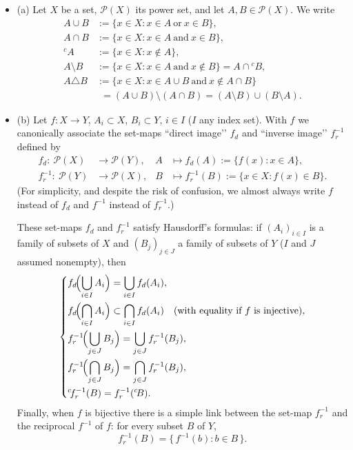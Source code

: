 \documentclass[12pt]{article}
\theoremstyle{definition}
\begin{document}
\medskip\noindent
\begin{itemize}
\item (a) Let $X$ be a set, $\mathcal P(X)$ its power set, and let $A,B\in\mathcal P(X)$. We write
\[
\begin{aligned}
A\cup B &:= \{x\in X: x\in A\ \text{or}\ x\in B\},\\
A\cap B &:= \{x\in X: x\in A\ \text{and}\ x\in B\},\\
{}^{c}\!A &:= \{x\in X: x\notin A\},\\
A\setminus B &:= \{x\in X: x\in A\ \text{and}\ x\notin B\}=A\cap{}^{c}\!B,\\
A\triangle B &:= \{x\in X: x\in A\cup B\ \text{and}\ x\notin A\cap B\}\\
&\phantom{:}= (A\cup B)\setminus(A\cap B)=(A\setminus B)\cup(B\setminus A).
\end{aligned}
\]
\medskip\noindent
\item (b) Let $f:X\to Y$, $A_i\subset X$, $B_i\subset Y$, $i\in I$ ($I$ any index set). With $f$ we canonically associate the set-maps “direct image’’ $f_d$ and “inverse image’’ $f_r^{-1}$ defined by
\[
\begin{aligned}
f_d:\ \mathcal P(X) &\longrightarrow \mathcal P(Y), & A &\longmapsto f_d(A):=\{f(x):x\in A\},\\
f_r^{-1}:\ \mathcal P(Y) &\longrightarrow \mathcal P(X), & B &\longmapsto f_r^{-1}(B):=\{x\in X: f(x)\in B\}.
\end{aligned}
\]
(For simplicity, and despite the risk of confusion, we almost always write $f$ instead of $f_d$ and $f^{-1}$ instead of $f_r^{-1}$.)

These set-maps $f_d$ and $f_r^{-1}$ satisfy Hausdorff’s formulas: if $(A_i)_{i\in I}$ is a family of subsets of $X$ and $(B_j)_{j\in J}$ a family of subsets of $Y$ ($I$ and $J$ assumed nonempty), then
\[
\left\{
\begin{aligned}
&f_d\!\Bigl(\bigcup_{i\in I}A_i\Bigr)=\bigcup_{i\in I} f_d(A_i),\\
&f_d\!\Bigl(\bigcap_{i\in I}A_i\Bigr)\subset\bigcap_{i\in I} f_d(A_i)\quad \text{(with equality if $f$ is injective)},\\
&f_r^{-1}\!\Bigl(\bigcup_{j\in J}B_j\Bigr)=\bigcup_{j\in J} f_r^{-1}(B_j),\\
&f_r^{-1}\!\Bigl(\bigcap_{j\in J}B_j\Bigr)=\bigcap_{j\in J} f_r^{-1}(B_j),\\
&{}^{c}\!f_r^{-1}(B)=f_r^{-1}({}^{c}\!B).
\end{aligned}
\right.
\]
Finally, when $f$ is bijective there is a simple link between the set-map $f_r^{-1}$ and the reciprocal $f^{-1}$ of $f$: for every subset $B$ of $Y$,
\[
f_r^{-1}(B)=\{\,f^{-1}(b): b\in B\,\}.
\]


\end{itemize}
\end{document}
